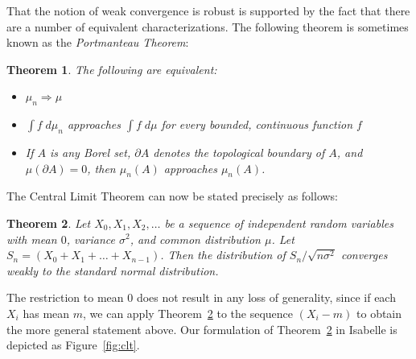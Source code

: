 \documentclass{article}
\newtheorem{theorem}{Theorem}[section]
\begin{document}
That the notion of weak convergence is robust is supported by the fact that there are a number of equivalent characterizations. The following theorem is sometimes known as the \emph{Portmanteau Theorem}:
\begin{theorem}
The following are equivalent:
\begin{itemize}
 \item $\mu_n \Rightarrow \mu$
 \item $\int f \; d\mu_n$ approaches $\int f \; d\mu$ for every bounded, continuous function $f$
 \item If $A$ is any Borel set, $\partial A$ denotes the topological boundary of $A$, and $\mu(\partial A) = 0$, then $\mu_n(A)$ approaches $\mu_n(A)$. 
\end{itemize}
\end{theorem}
The Central Limit Theorem can now be stated precisely as follows:
\begin{theorem}
\label{theorem:clt}
Let $X_0, X_1, X_2, \ldots$ be a sequence of independent random variables with mean $0$, variance $\sigma^2$, and common distribution $\mu$. Let $S_n = (X_0 + X_1 + \ldots + X_{n-1})$. Then the distribution of $S_n / \sqrt{n \sigma^2}$ converges weakly to the standard normal distribution.
\end{theorem}
The restriction to mean $0$ does not result in any loss of generality, since if each $X_i$ has mean $m$, we can apply Theorem~\ref{theorem:clt} to the sequence $(X_i - m)$ to obtain the more general statement above. Our formulation of Theorem~\ref{theorem:clt} in Isabelle is depicted as Figure~\ref{fig:clt}.
\end{document}

